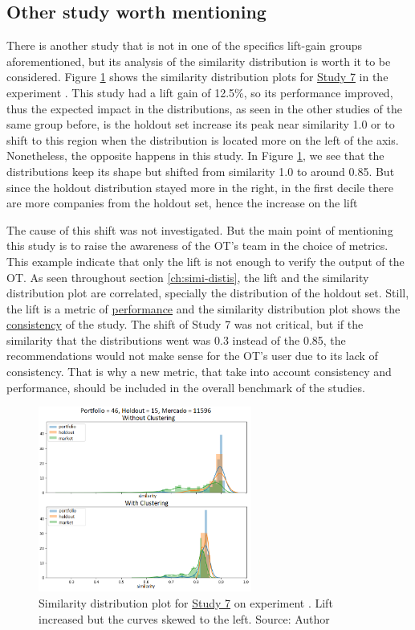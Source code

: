 \subsection{Other study worth mentioning}
\label{ch:worth-ment}

There is another study that is not in one of the specifics lift-gain groups aforementioned, but its analysis of the similarity distribution is worth it to be considered. Figure \ref{fig:worth-mentioning-study-7} shows the similarity distribution plots for \underline{Study 7} in the experiment \nameExperimentII{}. This study had a lift gain of 12.5\%, so its performance improved, thus the expected impact in the distributions, as seen in the other studies of the same group before, is the holdout set increase its peak near similarity 1.0 or to shift to this region when the distribution is located more on the left of the axis. Nonetheless, the opposite happens in this study. In Figure \ref{fig:worth-mentioning-study-7}, we see that the distributions keep its shape but shifted from similarity 1.0 to around 0.85. But since the holdout distribution stayed more in the right, in the first decile there are more companies from the holdout set, hence the increase on the lift

The cause of this shift was not investigated. But the main point of mentioning this study is to raise the awareness of the OT's team in the choice of metrics. This example indicate that only the lift is not enough to verify the output of the OT. As seen throughout section \ref{ch:simi-distis}, the lift and the similarity distribution plot are correlated, specially the distribution of the holdout set. Still, the lift is a metric of \underline{performance} and the similarity distribution plot shows the \underline{consistency} of the study. The shift of Study 7 was not critical, but if the similarity that the distributions went was 0.3 instead of the 0.85, the recommendations would not make sense for the OT's user due to its lack of consistency. That is why a new metric, that take into account consistency and performance, should be included in the overall benchmark of the studies.

\begin{figure}[h]
   \centering
   \includegraphics[width=7cm]{fig/ch4-worth-mentioning-study-7.png}
   \caption{Similarity distribution plot for \underline{Study 7} on experiment \nameExperimentII{}. Lift increased but the curves skewed to the left. Source: Author}
   \label{fig:worth-mentioning-study-7}
\end{figure}

